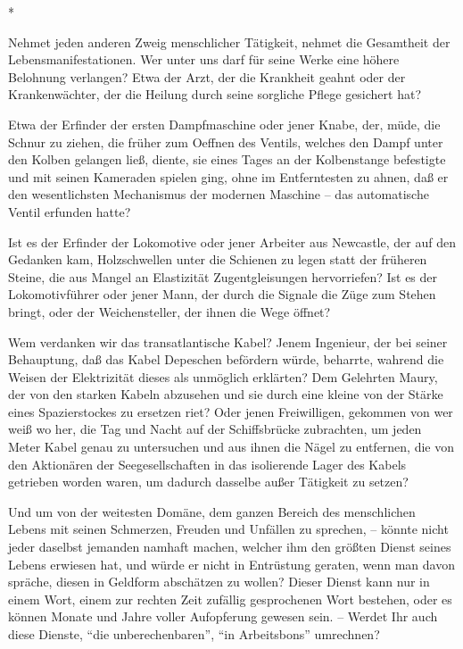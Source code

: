 \documentclass{scrbook}
\begin{document}
\begin{center}*\end{center}

Nehmet jeden anderen Zweig menschlicher Tätigkeit, nehmet die Gesamtheit der Lebensmanifestationen. Wer unter uns darf für seine Werke eine höhere Belohnung verlangen? Etwa der Arzt, der die Krankheit geahnt oder der Krankenwächter, der die Heilung durch seine sorgliche Pflege gesichert hat?

Etwa der Erfinder der ersten Dampfmaschine oder jener Knabe, der, müde, die Schnur zu ziehen, die früher zum Oeffnen des Ventils, welches den Dampf unter den Kolben gelangen ließ, diente, sie eines Tages an der Kolbenstange befestigte und mit seinen Kameraden spielen ging, ohne im Entferntesten zu ahnen, daß er den wesentlichsten Mechanismus der modernen Maschine – das automatische Ventil erfunden hatte?

Ist es der Erfinder der Lokomotive oder jener Arbeiter aus Newcastle, der auf den Gedanken kam, Holzschwellen unter die Schienen zu legen statt der früheren Steine, die aus Mangel an Elastizität Zugentgleisungen hervorriefen? Ist es der Lokomotivführer oder jener Mann, der durch die Signale die Züge zum Stehen bringt, oder der Weichensteller, der ihnen die Wege öffnet?

Wem verdanken wir das transatlantische Kabel? Jenem Ingenieur, der bei seiner Behauptung, daß das Kabel Depeschen befördern würde, beharrte, wahrend die Weisen der Elektrizität dieses als unmöglich erklärten? Dem Gelehrten Maury, der von den starken Kabeln abzusehen und sie durch eine kleine von der Stärke eines Spazierstockes zu ersetzen riet? Oder jenen Freiwilligen, gekommen von wer weiß wo her, die Tag und Nacht auf der Schiffsbrücke zubrachten, um jeden Meter Kabel genau zu untersuchen und aus ihnen die Nägel zu entfernen, die von den Aktionären der Seegesellschaften in das isolierende Lager des Kabels getrieben worden waren, um dadurch dasselbe außer Tätigkeit zu setzen?

Und um von der weitesten Domäne, dem ganzen Bereich des menschlichen Lebens mit seinen Schmerzen, Freuden und Unfällen zu sprechen, – könnte nicht jeder daselbst jemanden namhaft machen, welcher ihm den größten Dienst seines Lebens erwiesen hat, und würde er nicht in Entrüstung geraten, wenn man davon spräche, diesen in Geldform abschätzen zu wollen? Dieser Dienst kann nur in einem Wort, einem zur rechten Zeit zufällig gesprochenen Wort bestehen, oder es können Monate und Jahre voller Aufopferung gewesen sein. – Werdet Ihr auch diese Dienste, ``die unberechenbaren'', ``in Arbeitsbons'' umrechnen?
\end{document}
